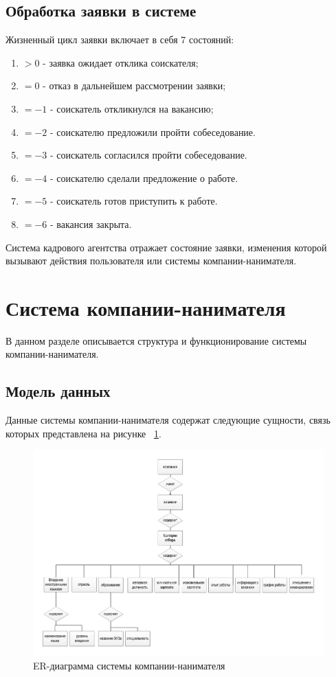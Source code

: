 \subsection{Обработка заявки в системе}
Жизненный цикл заявки включает в себя 7 состояний:
\begin{enumerate}
\item $>0$ - заявка ожидает отклика соискателя;
\item $=0$ - отказ в дальнейшем рассмотрении заявки;
\item $=-1$ - соискатель откликнулся на вакансию;
\item $=-2$ - соискателю предложили пройти собеседование.
\item $=-3$ - соискатель согласился пройти собеседование.
\item $=-4$ - соискателю сделали предложение о работе.
\item $=-5$ - соискатель готов приступить к работе.
\item $=-6$ - вакансия закрыта.
\end{enumerate}
Система кадрового агентства отражает состояние заявки, изменения которой вызывают действия пользователя или системы компании-нанимателя.

\section{Система компании-нанимателя}
В данном разделе описывается структура и функционирование системы компании-нанимателя. 

\subsection{Модель данных}
Данные системы компании-нанимателя содержат следующие сущности, связь которых представлена на рисунке ~\ref{fig:data-model-emp}.

\begin{figure}[h!]
\centering
 \includegraphics[width=\textwidth]{include/data-model-emp.pdf}
\caption{ER-диаграмма системы компании-нанимателя}
\label{fig:data-model-emp}
\end{figure}

